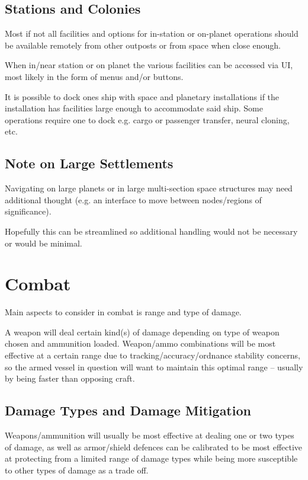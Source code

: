 \documentclass[a4paper,10pt]{article}
\begin{document}
\begin{multicols}{2}
\subsection{Stations and Colonies}
Most if not all facilities and options for in-station or on-planet operations
should be available remotely from other outposts or from space when close
enough.

When in/near station or on planet the various facilities can be accessed via
UI, most likely in the form of menus and/or buttons.

It is possible to dock ones ship with space and planetary installations if the
installation has facilities large enough to accommodate said ship. Some
operations require one to dock e.g. cargo or passenger transfer, neural
cloning, etc.

\subsection{Note on Large Settlements}
Navigating on large planets or in large multi-section space structures may
need additional thought (e.g. an interface to move between nodes/regions of
significance).

Hopefully this can be streamlined so additional handling would not be necessary
or would be minimal.

\end{multicols}


\section{Combat}
\begin{multicols}{2}
Main aspects to consider in combat is range and type of damage.

A weapon will deal certain kind(s) of damage depending on type of weapon chosen
and ammunition loaded. Weapon/ammo combinations will be most effective at a
certain range due to tracking/accuracy/ordnance stability concerns, so the armed
vessel in question will want to maintain this optimal range -- usually by being
faster than opposing craft.

\subsection{Damage Types and Damage Mitigation}
Weapons/ammunition will usually be most effective at dealing one or two types
of damage, as well as armor/shield defences can be calibrated to be most
effective at protecting from a limited range of damage types while being more
susceptible to other types of damage as a trade off.
\end{multicols}
\end{document}
